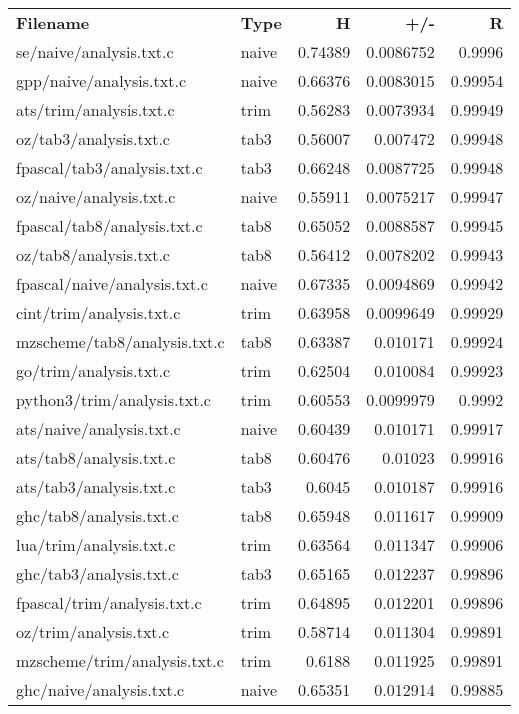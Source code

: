 \begin{longtable}{l l r r r}
\textbf{Filename} & \textbf{Type} & \textbf{H} & \textbf{+/-} & \textbf{R} \\
{se/naive/analysis.txt.c} & naive & 0.74389 & 0.0086752 & 0.9996 \\
{gpp/naive/analysis.txt.c} & naive & 0.66376 & 0.0083015 & 0.99954 \\
{ats/trim/analysis.txt.c} & trim & 0.56283 & 0.0073934 & 0.99949 \\
{oz/tab3/analysis.txt.c} & tab3 & 0.56007 & 0.007472 & 0.99948 \\
{fpascal/tab3/analysis.txt.c} & tab3 & 0.66248 & 0.0087725 & 0.99948 \\
{oz/naive/analysis.txt.c} & naive & 0.55911 & 0.0075217 & 0.99947 \\
{fpascal/tab8/analysis.txt.c} & tab8 & 0.65052 & 0.0088587 & 0.99945 \\
{oz/tab8/analysis.txt.c} & tab8 & 0.56412 & 0.0078202 & 0.99943 \\
{fpascal/naive/analysis.txt.c} & naive & 0.67335 & 0.0094869 & 0.99942 \\
{cint/trim/analysis.txt.c} & trim & 0.63958 & 0.0099649 & 0.99929 \\
{mzscheme/tab8/analysis.txt.c} & tab8 & 0.63387 & 0.010171 & 0.99924 \\
{go/trim/analysis.txt.c} & trim & 0.62504 & 0.010084 & 0.99923 \\
{python3/trim/analysis.txt.c} & trim & 0.60553 & 0.0099979 & 0.9992 \\
{ats/naive/analysis.txt.c} & naive & 0.60439 & 0.010171 & 0.99917 \\
{ats/tab8/analysis.txt.c} & tab8 & 0.60476 & 0.01023 & 0.99916 \\
{ats/tab3/analysis.txt.c} & tab3 & 0.6045 & 0.010187 & 0.99916 \\
{ghc/tab8/analysis.txt.c} & tab8 & 0.65948 & 0.011617 & 0.99909 \\
{lua/trim/analysis.txt.c} & trim & 0.63564 & 0.011347 & 0.99906 \\
{ghc/tab3/analysis.txt.c} & tab3 & 0.65165 & 0.012237 & 0.99896 \\
{fpascal/trim/analysis.txt.c} & trim & 0.64895 & 0.012201 & 0.99896 \\
{oz/trim/analysis.txt.c} & trim & 0.58714 & 0.011304 & 0.99891 \\
{mzscheme/trim/analysis.txt.c} & trim & 0.6188 & 0.011925 & 0.99891 \\
{ghc/naive/analysis.txt.c} & naive & 0.65351 & 0.012914 & 0.99885 \\

\end{longtable}

